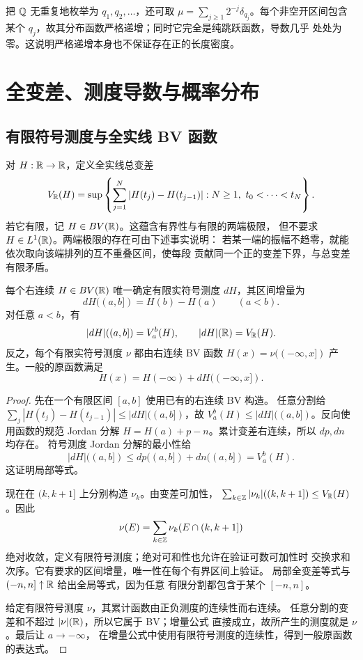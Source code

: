 把 \(\mathbb{Q}\) 无重复地枚举为 \(q_1,q_2,\ldots\)，还可取
\(\mu=\sum_{j\ge1}2^{-j}\delta_{q_j}\)。每个非空开区间包含某个
\(q_j\)，故其分布函数严格递增；同时它完全是纯跳跃函数，导数几乎
处处为零。这说明严格递增本身也不保证存在正的长度密度。

\section{全变差、测度导数与概率分布}
\label{sec:stieltjes-variation-derivative}

\subsection{有限符号测度与全实线 BV 函数}

对 \(H:\mathbb{R}\to\mathbb{R}\)，定义全实线总变差
\[
 V_{\mathbb{R}}(H)=\sup\left\{\sum_{j=1}^N|H(t_j)-H(t_{j-1})|:
 N\ge1,\ t_0<\cdots<t_N\right\}.
\]
若它有限，记 \(H\in BV(\mathbb{R})\)。这蕴含有界性与有限的两端极限，
但不要求 \(H\in L^1(\mathbb{R})\)。两端极限的存在可由下述事实说明：
若某一端的振幅不趋零，就能依次取向该端排列的互不重叠区间，使每段
贡献同一个正的变差下界，与总变差有限矛盾。

\begin{theorem}\label{thm:stieltjes-signed-bv}
每个右连续 \(H\in BV(\mathbb{R})\) 唯一确定有限实符号测度 \(dH\)，其区间增量为
\[
 dH((a,b])=H(b)-H(a)\qquad(a<b).
\]
对任意 \(a<b\)，有
\begin{equation}\label{eq:stieltjes-total-variation}
 |dH|((a,b])=V_a^b(H),\qquad |dH|(\mathbb{R})=V_{\mathbb{R}}(H).
\end{equation}
反之，每个有限实符号测度 \(\nu\) 都由右连续 BV 函数
\(H(x)=\nu(({-\infty},x])\) 产生。一般的原函数满足
\[
 H(x)=H(-\infty)+dH(({-\infty},x]).
\]
\end{theorem}
\begin{proof}
先在一个有限区间 \([a,b]\) 使用已有的右连续 BV 构造。
任意分割给
\(\sum_j|H(t_j)-H(t_{j-1})|\le |dH|((a,b])\)，故
\(V_a^b(H)\le |dH|((a,b])\)。反向使用函数的规范 Jordan 分解
\(H=H(a)+p-n\)。累计变差右连续，所以 \(dp,dn\) 均存在。
符号测度 Jordan 分解的最小性给
\[
 |dH|((a,b])\le dp((a,b])+dn((a,b])=V_a^b(H).
\]
这证明局部等式。

现在在 \((k,k+1]\) 上分别构造 \(\nu_k\)。由变差可加性，
\(\sum_{k\in\mathbb{Z}}|\nu_k|((k,k+1])\le V_{\mathbb{R}}(H)\)。因此
\[
 \nu(E)=\sum_{k\in\mathbb{Z}}\nu_k(E\cap(k,k+1])
\]
绝对收敛，定义有限符号测度；绝对可和性也允许在验证可数可加性时
交换求和次序。它有要求的区间增量，唯一性在每个有界区间上验证。
局部全变差等式与 \((-n,n]\uparrow\mathbb{R}\) 给出全局等式，因为任意
有限分割都包含于某个 \([-n,n]\)。

给定有限符号测度 \(\nu\)，其累计函数由正负测度的连续性而右连续。
任意分割的变差和不超过 \(|\nu|(\mathbb{R})\)，所以它属于 BV；增量公式
直接成立，故所产生的测度就是 \(\nu\)。最后让 \(a\to-\infty\)，
在增量公式中使用有限符号测度的连续性，得到一般原函数的表达式。
\end{proof}

